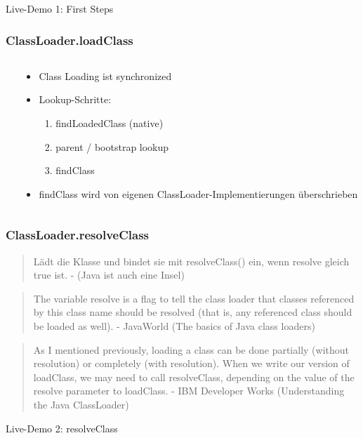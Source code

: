 \documentclass[aspectratio=169]{beamer}
\begin{document}
\begin{frame}
	Live-Demo 1: First Steps
\end{frame}

\begin{frame}
	\frametitle{ClassLoader.loadClass}
	\begin{columns}[T] 
		\begin{column}{.57\textwidth}
			
		\end{column}
		\hfill
		\begin{column}{.43\textwidth}
			\begin{itemize}
				\item{Class Loading ist synchronized}
				\item{Lookup-Schritte:}
				\begin{enumerate}
				\item{findLoadedClass (native)}
				\item{parent / bootstrap lookup}
				\item{findClass}
				\end{enumerate}
				\item{findClass wird von eigenen ClassLoader-Implementierungen überschrieben}
			\end{itemize}
		\end{column}
	\end{columns}
\end{frame}

\begin{frame}
	\frametitle{ClassLoader.resolveClass}
	
	\begin{quote}
		\tiny{Lädt die Klasse und bindet sie mit resolveClass() ein, wenn resolve gleich true ist. - (Java ist auch eine Insel)}
	\end{quote}
	\begin{quote}
		\tiny{The variable resolve is a flag to tell the class loader that classes referenced by this class name should be resolved (that is, any referenced class should be loaded as well). - JavaWorld (The basics of Java class loaders)}
	\end{quote}
	\begin{quote}
	\tiny{As I mentioned previously, loading a class can be done partially (without resolution) or completely (with resolution). When we write our version of loadClass, we may need to call resolveClass, depending on the value of the resolve parameter to loadClass. - IBM Developer Works (Understanding the Java ClassLoader)}
	\end{quote}
	Live-Demo 2: resolveClass 
	\pause
	
\end{frame}
\end{document}
